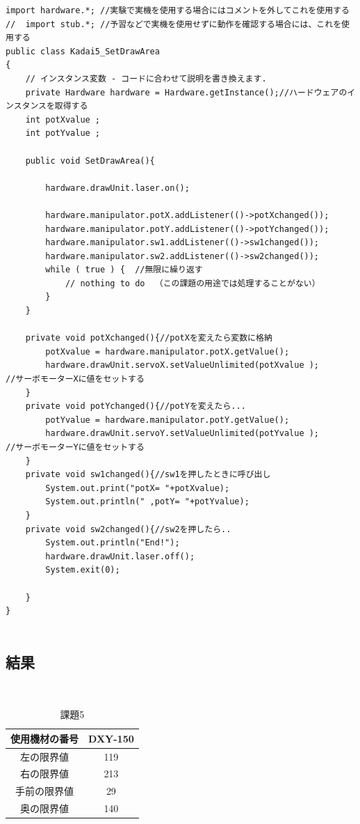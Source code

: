 \documentclass{jarticle}
\begin{document}
\begin{lstlisting}[caption=SetDrawArea]
import hardware.*; //実験で実機を使用する場合にはコメントを外してこれを使用する
//  import stub.*; //予習などで実機を使用せずに動作を確認する場合には、これを使用する
public class Kadai5_SetDrawArea
{
    // インスタンス変数 - コードに合わせて説明を書き換えます.
    private Hardware hardware = Hardware.getInstance();//ハードウェアのインスタンスを取得する
    int potXvalue ; 
    int potYvalue ;
    
    public void SetDrawArea(){
    
        hardware.drawUnit.laser.on();
        
        hardware.manipulator.potX.addListener(()->potXchanged());
        hardware.manipulator.potY.addListener(()->potYchanged());
        hardware.manipulator.sw1.addListener(()->sw1changed());
        hardware.manipulator.sw2.addListener(()->sw2changed());
        while ( true ) {  //無限に繰り返す
            // nothing to do  （この課題の用途では処理することがない）
        }
    }
    
    private void potXchanged(){//potXを変えたら変数に格納
        potXvalue = hardware.manipulator.potX.getValue();
        hardware.drawUnit.servoX.setValueUnlimited(potXvalue );         //サーボモーターXに値をセットする
    }
    private void potYchanged(){//potYを変えたら...
        potYvalue = hardware.manipulator.potY.getValue();
        hardware.drawUnit.servoY.setValueUnlimited(potYvalue );      //サーボモーターYに値をセットする
    }
    private void sw1changed(){//sw1を押したときに呼び出し
        System.out.print("potX= "+potXvalue);
        System.out.println(" ,potY= "+potYvalue);
    }
    private void sw2changed(){//sw2を押したら..
        System.out.println("End!");
        hardware.drawUnit.laser.off();
        System.exit(0);
        
    }
}
    

\end{lstlisting}

\subsection{結果}
\\


\begin{table}[h]
    \centering
    \caption{課題5}
    \begin{tabular}{c|c}
    使用機材の番号     &DXY-150  \\
    \hline
    左の限界値     &119\\
    右の限界値  &213\\
    手前の限界値&29\\
    奥の限界値&140\\
    \end{tabular}
    
    \label{tab:my_label}
\end{table}
\end{document}
